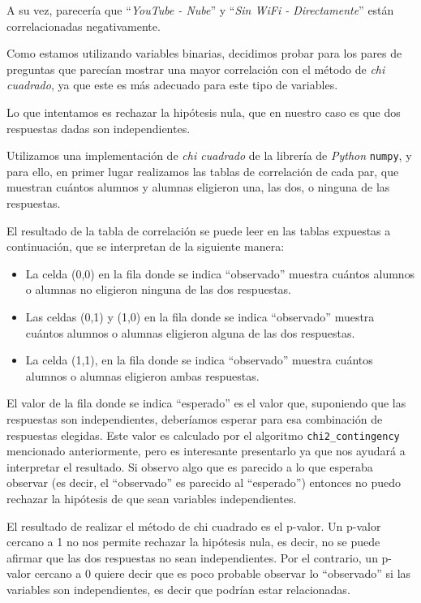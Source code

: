 A su vez, parecería que ``\textit{YouTube - Nube}'' y ``\textit{Sin WiFi - Directamente}'' están correlacionadas negativamente.

Como estamos utilizando variables binarias, decidimos probar para los pares de preguntas que parecían mostrar una mayor correlación con el método de \textit{chi cuadrado}, ya que este es más adecuado para este tipo de variables.

Lo que intentamos es rechazar la hipótesis nula, que en nuestro caso es que dos respuestas dadas son independientes. 

Utilizamos una implementación de \textit{chi cuadrado} de la librería de \textit{Python} \texttt{numpy}, y para ello, en primer lugar realizamos las tablas de correlación de cada par, que muestran cuántos alumnos y alumnas eligieron una, las dos, o ninguna de las respuestas. 

El resultado de la tabla de correlación se puede leer en las tablas expuestas a continuación, que se interpretan de la siguiente manera:

\begin{itemize}
    \item La celda (0,0) en la fila donde se indica “observado'' muestra cuántos alumnos o alumnas no eligieron ninguna de las dos respuestas.
    \item Las celdas (0,1) y (1,0)  en la fila donde se indica “observado'' muestra cuántos alumnos o alumnas eligieron alguna de las dos respuestas.
    \item La celda (1,1), en la fila donde se indica “observado'' muestra cuántos alumnos o alumnas eligieron ambas respuestas.

\end{itemize}

El valor de la fila donde se indica ``esperado'' es el valor que, suponiendo que las respuestas son independientes, deberíamos esperar para esa combinación de respuestas elegidas. Este valor es calculado por el algoritmo \texttt{chi2\_contingency} mencionado anteriormente, pero es interesante presentarlo ya que nos ayudará a interpretar el resultado. Si observo algo que es parecido a lo que esperaba observar (es decir, el ``observado'' es parecido al ``esperado'') entonces no puedo rechazar la hipótesis de que sean variables independientes.

El resultado de realizar el método de chi cuadrado es el p-valor. Un p-valor cercano a 1 no nos permite rechazar la hipótesis nula, es decir, no se puede afirmar que las dos respuestas no sean independientes. Por el contrario, un p-valor cercano a 0 quiere decir que es poco probable observar lo “observado” si las variables son independientes, es decir que podrían estar relacionadas. 

